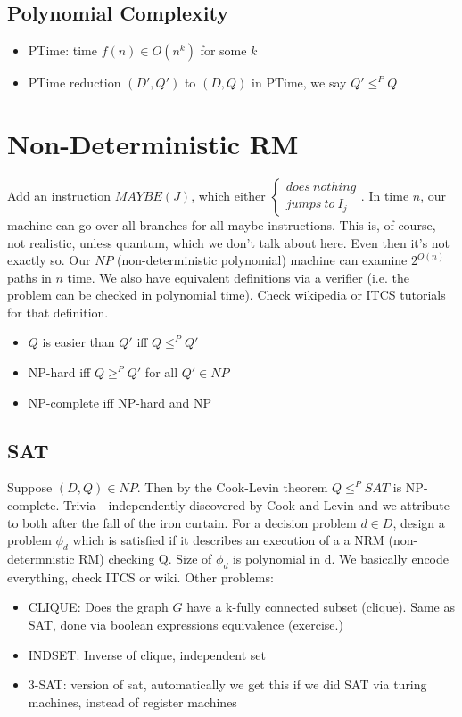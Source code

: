 \documentclass{article}
\begin{document}
\subsection{Polynomial Complexity}
\begin{itemize}
    \item PTime: time $f(n) \in O(n^k)$ for some $k$
    \item PTime reduction $(D', Q')$ to $(D, Q)$ in PTime, we say $Q' \leq^P Q$
\end{itemize}

\section{Non-Deterministic RM}
Add an instruction $MAYBE(J)$, which either
$\begin{cases}
    does\ nothing \\
    jumps\ to\ I_j
\end{cases}
$. In time $n$, our machine can go over all branches for all maybe instructions. This is, of course, not realistic, unless quantum, which we don't talk about here. Even then it's not exactly so. Our $NP$ (non-deterministic polynomial) machine can examine $2^{O(n)}$ paths in $n$ time. We also have equivalent definitions via a verifier (i.e. the problem can be checked in polynomial time). Check wikipedia or ITCS tutorials for that definition.

\begin{itemize}
    \item $Q$ is easier than $Q'$ iff $Q \leq^P Q'$
    \item NP-hard iff $Q \geq^P Q'$ for all $Q' \in NP$
    \item NP-complete iff NP-hard and NP 
\end{itemize}

\subsection{SAT}
Suppose $(D, Q) \in NP$. Then by the Cook-Levin theorem $Q \leq^P SAT$ is NP-complete. Trivia - independently discovered by Cook and Levin and we attribute to both after the fall of the iron curtain.
\vskip 0.1in
For a decision problem $d \in D$, design a problem $\phi_d$ which is satisfied
if it describes an execution of a a NRM (non-determnistic RM) checking Q. Size of $\phi_d$ is polynomial in d. We basically encode everything, check ITCS or wiki. Other problems:

\begin{itemize}
    \item CLIQUE: Does the graph $G$ have a k-fully connected subset (clique). Same as SAT, done via boolean expressions equivalence (exercise.)
    \item INDSET: Inverse of clique, independent set
    \item 3-SAT: version of sat, automatically we get this if we did SAT via turing machines, instead of register machines
\end{itemize}
\end{document}
